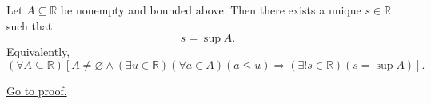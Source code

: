 \begin{theorem}
\label{thm:lub-property-implies-existence-of-suprema}
Let $A\subseteq\mathbb{R}$ be nonempty and bounded above. Then there
exists a unique $s\in\mathbb{R}$ such that
\[
  s=\sup A.
\]
Equivalently,
\[
  (\forall A\subseteq\mathbb{R})
  \left[
    A\neq\varnothing
    \land
    (\exists u\in\mathbb{R})(\forall a\in A)(a\leq u)
    \Longrightarrow
    (\exists!s\in\mathbb{R})(s=\sup A)
  \right].
\]

\hyperref[prf:lub-property-implies-existence-of-suprema]{Go to proof.}
\end{theorem}